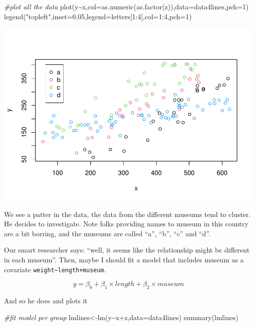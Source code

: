 \documentclass[
]{book}
\newenvironment{Shaded}{\begin{snugshade}}{\end{snugshade}}
\newcommand{\AttributeTok}[1]{\textcolor[rgb]{0.77,0.63,0.00}{#1}}
\newcommand{\CommentTok}[1]{\textcolor[rgb]{0.56,0.35,0.01}{\textit{#1}}}
\newcommand{\DecValTok}[1]{\textcolor[rgb]{0.00,0.00,0.81}{#1}}
\newcommand{\FloatTok}[1]{\textcolor[rgb]{0.00,0.00,0.81}{#1}}
\newcommand{\FunctionTok}[1]{\textcolor[rgb]{0.00,0.00,0.00}{#1}}
\newcommand{\NormalTok}[1]{#1}
\newcommand{\OtherTok}[1]{\textcolor[rgb]{0.56,0.35,0.01}{#1}}
\newcommand{\SpecialCharTok}[1]{\textcolor[rgb]{0.00,0.00,0.00}{#1}}
\newcommand{\StringTok}[1]{\textcolor[rgb]{0.31,0.60,0.02}{#1}}
\begin{document}
\begin{Shaded}
\begin{Highlighting}[]
\CommentTok{\#plot all the data}
\FunctionTok{plot}\NormalTok{(y}\SpecialCharTok{\textasciitilde{}}\NormalTok{x,}\AttributeTok{col=}\FunctionTok{as.numeric}\NormalTok{(}\FunctionTok{as.factor}\NormalTok{(z)),}\AttributeTok{data=}\NormalTok{data4lines,}\AttributeTok{pch=}\DecValTok{1}\NormalTok{)}
\FunctionTok{legend}\NormalTok{(}\StringTok{"topleft"}\NormalTok{,}\AttributeTok{inset=}\FloatTok{0.05}\NormalTok{,}\AttributeTok{legend=}\NormalTok{letters[}\DecValTok{1}\SpecialCharTok{:}\DecValTok{4}\NormalTok{],}\AttributeTok{col=}\DecValTok{1}\SpecialCharTok{:}\DecValTok{4}\NormalTok{,}\AttributeTok{pch=}\DecValTok{1}\NormalTok{)}
\end{Highlighting}
\end{Shaded}

\includegraphics{ECOMODbook_files/figure-latex/a7.11-1.pdf}

We see a patter in the data, the data from the different museums tend to cluster. He decides to investigate. Note folks providing names to museum in this country are a bit borring, and the museums are called ``a'', ``b'', ``c'' and ``d''.

Our smart researcher says: ``well, it seems like the relationship might be different in each museum''. Then, maybe I should fit a model that includes museum as a covariate \texttt{weight\textasciitilde{}length+museum}.

\[y=\beta_0+\beta_1 \times length +\beta_2 \times museum\]

And so he does and plots it

\begin{Shaded}
\begin{Highlighting}[]
\CommentTok{\#fit model per group}
\NormalTok{lmlines}\OtherTok{\textless{}{-}}\FunctionTok{lm}\NormalTok{(y}\SpecialCharTok{\textasciitilde{}}\NormalTok{x}\SpecialCharTok{+}\NormalTok{z,}\AttributeTok{data=}\NormalTok{data4lines)}
\FunctionTok{summary}\NormalTok{(lmlines)}
\end{Highlighting}
\end{Shaded}
\end{document}
